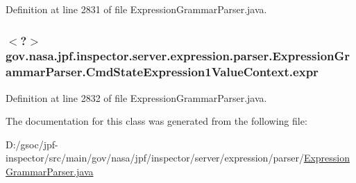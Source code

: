 Definition at line 2831 of file Expression\+Grammar\+Parser.\+java.

\subsubsection[{\texorpdfstring{expr}{expr}}]{$<$?$>$ gov.\+nasa.\+jpf.\+inspector.\+server.\+expression.\+parser.\+Expression\+Grammar\+Parser.\+Cmd\+State\+Expression1\+Value\+Context.\+expr}\hypertarget{classgov_1_1nasa_1_1jpf_1_1inspector_1_1server_1_1expression_1_1parser_1_1_expression_grammar_paacaa2424bb30d5b61478a2ac87dd697e_a41e227629b06c5b20a032613cd62b5ba}{}\label{classgov_1_1nasa_1_1jpf_1_1inspector_1_1server_1_1expression_1_1parser_1_1_expression_grammar_paacaa2424bb30d5b61478a2ac87dd697e_a41e227629b06c5b20a032613cd62b5ba}


Definition at line 2832 of file Expression\+Grammar\+Parser.\+java.



The documentation for this class was generated from the following file\+:\begin{DoxyCompactItemize}
\item 
D\+:/gsoc/jpf-\/inspector/src/main/gov/nasa/jpf/inspector/server/expression/parser/\hyperlink{_expression_grammar_parser_8java}{Expression\+Grammar\+Parser.\+java}\end{DoxyCompactItemize}
